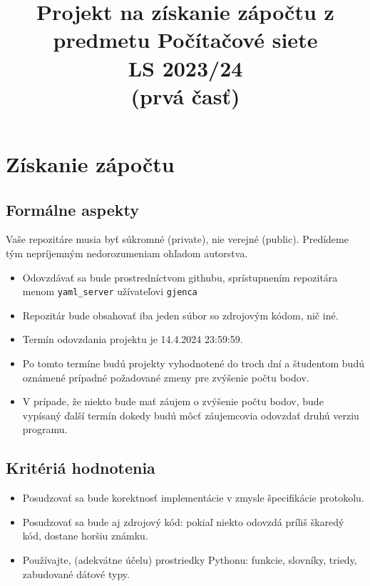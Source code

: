 \documentclass[11pt]{article}
\theoremstyle{definition}
\begin{document}
\title{Projekt na získanie zápočtu z predmetu Počítačové siete\\LS 2023/24\\
(prvá časť)}
\maketitle
\section{Získanie zápočtu}
\subsection{Formálne aspekty}

\begin{tcolorbox}[colback=red!5!white,colframe=red!75!black]
Vaše repozitáre musia byť súkromné (private), nie verejné (public). Predídeme
tým nepríjemným nedorozumeniam ohľadom autorstva.
\end{tcolorbox}

\begin{itemize}
\item Odovzdávať sa bude prostredníctvom githubu, sprístupnením repozitára
menom \texttt{yaml\_server} užívateľovi \texttt{gjenca}
\item Repozitár bude obsahovať iba jeden súbor so zdrojovým kódom, nič iné.
\item Termín odovzdania projektu je 14.4.2024 23:59:59.
\item Po tomto termíne budú projekty vyhodnotené do troch dní a študentom budú oznámené prípadné požadované zmeny pre zvýšenie počtu bodov.
\item V prípade, že niekto bude mať záujem o zvýšenie počtu bodov, bude
vypísaný ďalší termín dokedy budú môcť záujemcovia odovzdať druhú verziu
programu.
\end{itemize}

\subsection{Kritériá hodnotenia}
\begin{itemize}
\item Posudzovať sa bude korektnosť implementácie v zmysle špecifikácie protokolu.
\item Posudzovať sa bude aj zdrojový kód: pokiaľ niekto odovzdá príliš škaredý kód, dostane horšiu známku.
\item Používajte, (adekvátne účelu) prostriedky Pythonu: funkcie, slovníky, triedy, zabudované dátové typy.
\end{itemize}
\end{document}
